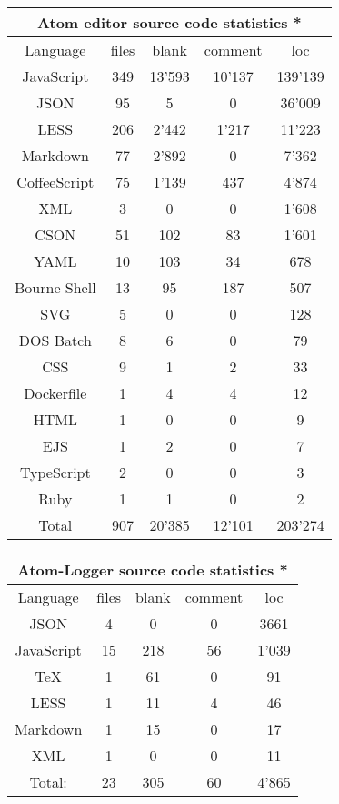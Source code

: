 \documentclass[a4paper,10pt]{report}
\begin{document}
\begin{center}
 \begin{tabular}{|c | c | c | c | c |}
 \hline
 \multicolumn{5}{|c|}{Atom editor source code statistics *}\\
 \hline
 Language & files & blank & comment & loc \\ [0.5ex] 
 \hline\hline
 JavaScript & 349 & 13'593 & 10'137 & 139'139\\ 
 \hline
 JSON & 95 & 5 & 0 & 36'009\\ 
 \hline
 LESS & 206 & 2'442 & 1'217 & 11'223\\
 \hline
 Markdown & 77 & 2'892 & 0 & 7'362\\
 \hline
 CoffeeScript & 75 & 1'139 & 437 & 4'874\\
 \hline
 XML & 3 & 0 & 0 & 1'608\\
 \hline
 CSON & 51 & 102 & 83 & 1'601\\
 \hline
 YAML & 10 & 103 & 34 & 678\\
 \hline
 Bourne Shell & 13 & 95 & 187 & 507\\
 \hline
 SVG & 5 & 0 & 0 & 128\\
 \hline
 DOS Batch & 8 & 6 & 0 & 79\\
 \hline
 CSS & 9 & 1 & 2 & 33\\
 \hline
 Dockerfile & 1 & 4 & 4 & 12\\
 \hline
 HTML & 1 & 0 & 0 & 9\\
 \hline
 EJS & 1 & 2 & 0 & 7\\
 \hline
 TypeScript & 2 & 0 & 0 & 3\\
 \hline
 Ruby & 1 & 1 & 0 & 2\\ 
 \hline
 \hline
 Total & 907 & 20'385 & 12'101 & 203'274\\ [1ex]
 \hline
\end{tabular}
\end{center}

\begin{center}
 \begin{tabular}{|c | c | c | c | c |}
 \hline
 \multicolumn{5}{|c|}{Atom-Logger source code statistics *}\\
 \hline
 Language & files & blank & comment & loc \\ [0.5ex] 
 \hline\hline
 JSON & 4 & 0 & 0 & 3661\\
 \hline
 JavaScript & 15 & 218 & 56 & 1'039\\
 \hline
 TeX & 1 & 61 & 0 & 91\\
 \hline
 LESS & 1 & 11 & 4 & 46\\
 \hline
 Markdown & 1 & 15 & 0 & 17\\
 \hline
 XML & 1 & 0 & 0 & 11\\
 \hline
 \hline
 Total: & 23 & 305 & 60 & 4'865\\ [1ex]
 \hline
\end{tabular}
\end{center}
\end{document}
